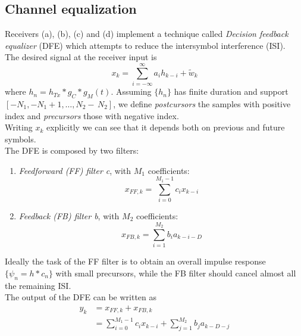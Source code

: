 \documentclass[a4paper, 12pt]{report}
\begin{document}
\subsection*{Channel equalization}
Receivers (a), (b), (c) and (d) implement a technique called \textit{Decision feedback equalizer} (DFE) which attempts to reduce the intersymbol interference (ISI).\\
The desired signal at the receiver input is
\begin{equation*}
x_k = \sum_{i=-\infty}^{\infty} a_i h_{k-i} + \tilde{w}_k
\end{equation*}
where $h_n = h_{Tx}*g_C * g_M(t)$. Assuming $\{h_n\}$ has finite duration and support $[-N_1, -N_1+1, \dots, N_2-\, N_2]$, we define \textit{postcursors} the samples with positive index and \textit{precursors} those with negative index.\\
Writing $x_k$ explicitly we can see that it depends both on previous and future symbols.\\
The DFE is composed by two filters:
\begin{enumerate}
	\item \textit{Feedforward (FF) filter c}, with $M_1$ coefficients:
	\begin{equation}
	x_{FF,k} = \sum_{i=0}^{M_1-1}c_ix_{k-i}
	\end{equation}\label{eq:ff_filter}
	\item \textit{Feedback (FB) filter b}, with $M_2$ coefficients:
	\begin{equation}
	x_{FB,k} = \sum_{i=1}^{M_2}b_i a_{k-i-D}
	\end{equation}\label{eq:fb_filter}
\end{enumerate}

Ideally the task of the FF filter is to obtain an overall impulse response $\{\psi_n = h * c_n\}$ with small precursors, while the FB filter should cancel almost all the remaining ISI.\\
The output of the DFE can be written as
\begin{equation}
	\begin{split}
	y_k &= x_{FF,k} + x_{FB,k} \\
	&= \sum_{i=0}^{M_1-1}c_ix_{k-i} + \sum_{j=1}^{M_2}b_ja_{k-D-j}
	\end{split} 
\end{equation}
\end{document}
